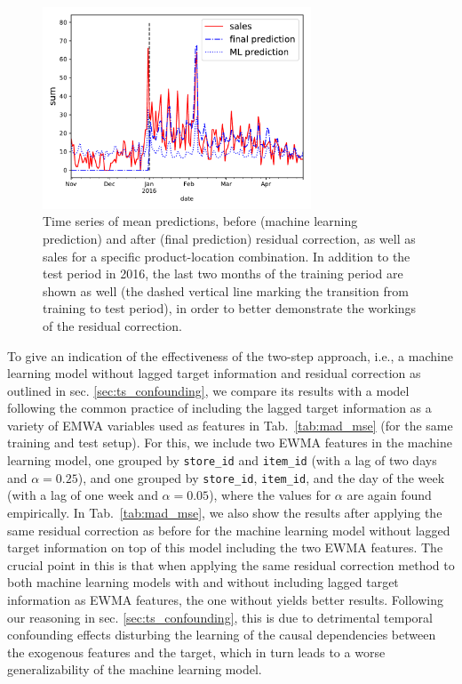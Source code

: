 \documentclass[BCOR=1mm, DIV=calc,10pt,
twoside=true,
twocolumn,
headings=normal]{scrartcl}
\newcommand{\tab}{Tab.~}
\begin{document}
\begin{figure}
\begin{center}
\includegraphics[width=8cm]{ts_item_16_store_2_res}
\caption{\label{fig:ts_res} Time series of mean predictions, before (machine learning prediction) and after (final prediction) residual correction, as well as sales for a specific product-location combination. In addition to the test period in 2016, the last two months of the training period are shown as well (the dashed vertical line marking the transition from training to test period), in order to better demonstrate the workings of the residual correction.}
\end{center}
\end{figure}

\noindent
To give an indication of the effectiveness of the two-step approach, i.e., a machine learning model without lagged target information and residual correction as outlined in sec. \ref{sec:ts_confounding}, we compare its results with a model following the common practice of including the lagged target information as a variety of EMWA variables used as features in \tab \ref{tab:mad_mse} (for the same training and test setup). For this, we include two EWMA features in the machine learning model, one grouped by \texttt{store\_id} and \texttt{item\_id} (with a lag of two days and $\alpha=0.25$), and one grouped by \texttt{store\_id}, \texttt{item\_id}, and the day of the week (with a lag of one week and $\alpha=0.05$), where the values for $\alpha$ are again found empirically. In \tab \ref{tab:mad_mse}, we also show the results after applying the same residual correction as before for the machine learning model without lagged target information on top of this model including the two EWMA features. The crucial point in this is that when applying the same residual correction method to both machine learning models with and without including lagged target information as EWMA features, the one without yields better results. Following our reasoning in sec. \ref{sec:ts_confounding}, this is due to detrimental temporal confounding effects disturbing the learning of the causal dependencies between the exogenous features and the target, which in turn leads to a worse generalizability of the machine learning model.
\end{document}
